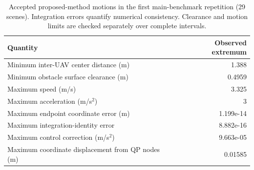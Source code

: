 \begin{table}[htbp]
\caption{Accepted proposed-method motions in the first main-benchmark repetition (29 scenes). Integration errors quantify numerical consistency. Clearance and motion limits are checked separately over complete intervals.\label{tab:verification-new}}
\centering\small
\begin{tabular}{lr}\toprule
Quantity & Observed extremum\\\midrule
Minimum inter-UAV center distance (m) & 1.388\\
Minimum obstacle surface clearance (m) & 0.4959\\
Maximum speed (m/s) & 3.325\\
Maximum acceleration (m/s$^2$) & 3\\
Maximum endpoint coordinate error (m) & 1.199e-14\\
Maximum integration-identity error & 8.882e-16\\
Maximum control correction (m/s$^2$) & 9.663e-05\\
Maximum coordinate displacement from QP nodes (m) & 0.01585\\
\bottomrule\end{tabular}
\end{table}
